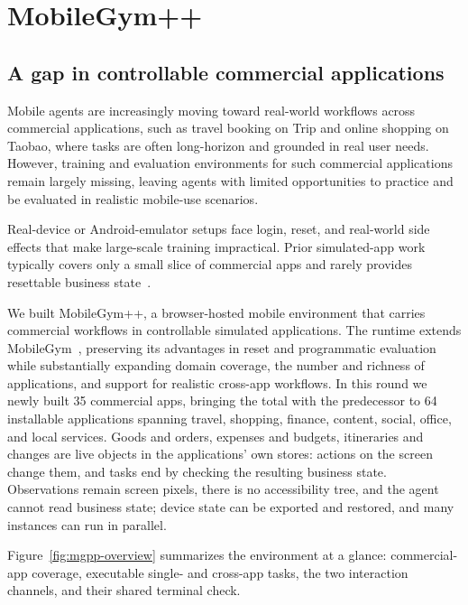 
\section{MobileGym++}
\label{sec:mobilegym++}
\label{sec:method}

\subsection{A gap in controllable commercial applications}
\label{sec:mgpp-env}

Mobile agents are increasingly moving toward real-world workflows across commercial applications, such as travel booking on Trip and online shopping on Taobao, where tasks are often long-horizon and grounded in real user needs. However, training and evaluation environments for such commercial applications remain largely missing, leaving agents with limited opportunities to practice and be evaluated in realistic mobile-use scenarios.

Real-device or Android-emulator setups face login, reset, and real-world side effects that make large-scale training impractical. Prior simulated-app work typically covers only a small slice of commercial apps and rarely provides resettable business state~\citep{rawles2025androidworld,kong2025mobileworld}.

We built MobileGym++, a browser-hosted mobile environment that carries commercial workflows in controllable simulated applications. The runtime extends MobileGym~\citep{wu2026mobilegym}, preserving its advantages in reset and programmatic evaluation while substantially expanding domain coverage, the number and richness of applications, and support for realistic cross-app workflows. In this round we newly built 35 commercial apps, bringing the total with the predecessor to 64 installable applications spanning travel, shopping, finance, content, social, office, and local services. Goods and orders, expenses and budgets, itineraries and changes are live objects in the applications' own stores: actions on the screen change them, and tasks end by checking the resulting business state. Observations remain screen pixels, there is no accessibility tree, and the agent cannot read business state; device state can be exported and restored, and many instances can run in parallel.

Figure~\ref{fig:mgpp-overview} summarizes the environment at a glance: commercial-app coverage, executable single- and cross-app tasks, the two interaction channels, and their shared terminal check.

